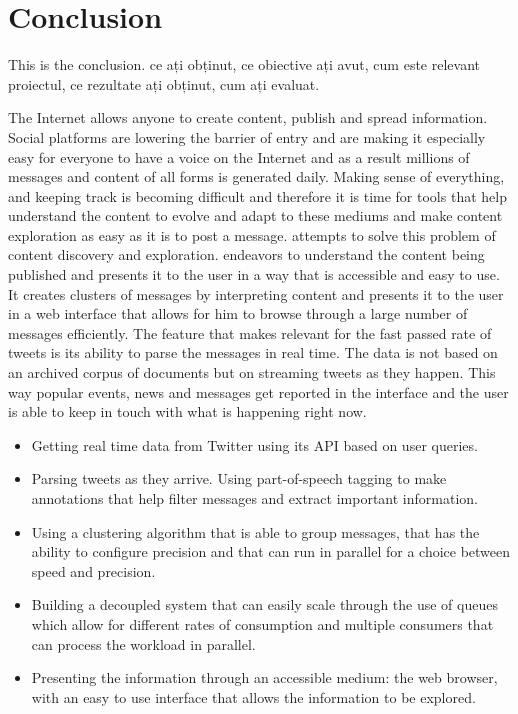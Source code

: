 \chapter{Conclusion}
\label{chapter:conclusion}

This is the conclusion.  ce ați obținut, ce obiective ați avut, cum este relevant proiectul, ce rezultate ați obținut, cum ați evaluat.

The Internet allows anyone to create content, publish and spread information. Social platforms are lowering the barrier of entry and are making it especially easy for everyone to have a voice on the Internet and as a result millions of messages and content of all forms is generated daily. Making sense of everything, and keeping track is becoming difficult and therefore it is time for tools that help understand the content to evolve and adapt to these mediums and make content exploration as easy as it is to post a message.
\newline
{\project}  attempts to solve this problem of content discovery and exploration. {\project}  endeavors to understand the content being published and presents it to the user in a way that is accessible and easy to use. It creates clusters of messages by interpreting content and presents it to the user in a web interface that allows for him to browse through a large number of messages efficiently.
\newline
The feature that makes {\project}  relevant for the fast passed rate of tweets is its ability to parse the messages in real time. The data is not based on an archived corpus of documents but on streaming tweets as they happen. This way popular events, news and messages get reported in the interface and the user is able to keep in touch with what is happening right now.
\newline
\begin{itemize}
	\item Getting real time data from Twitter using its API based on user queries.
	\item Parsing tweets as they arrive. Using part-of-speech tagging to make annotations that help filter messages and extract important information.
	\item Using a clustering algorithm that is able to group messages, that has the ability to configure precision and that can run in parallel for a choice between speed and precision. 
	\item Building a decoupled system that can easily scale through the use of queues which allow for different rates of consumption and multiple consumers that can process the workload in parallel.
	\item Presenting the information through an accessible medium: the web browser, with an easy to use interface that allows the information to be explored.
\end{itemize}
